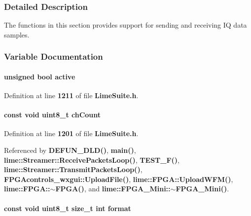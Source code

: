 \subsubsection{Detailed Description}
The functions in this section provides support for sending and receiving IQ data samples. 



\subsubsection{Variable Documentation}
\paragraph[{active}]{\setlength{\rightskip}{0pt plus 5cm}unsigned bool active}\label{group__FN__STREAM_ga44af5b3ba9277b57c8c05926b7a2b5cb}


Definition at line {\bf 1211} of file {\bf Lime\+Suite.\+h}.

\paragraph[{ch\+Count}]{\setlength{\rightskip}{0pt plus 5cm}const {\bf void} uint8\+\_\+t ch\+Count}\label{group__FN__STREAM_ga3c63a4089587cf189d87730ef2bf7402}


Definition at line {\bf 1201} of file {\bf Lime\+Suite.\+h}.



Referenced by {\bf D\+E\+F\+U\+N\+\_\+\+D\+L\+D()}, {\bf main()}, {\bf lime\+::\+Streamer\+::\+Receive\+Packets\+Loop()}, {\bf T\+E\+S\+T\+\_\+\+F()}, {\bf lime\+::\+Streamer\+::\+Transmit\+Packets\+Loop()}, {\bf F\+P\+G\+Acontrols\+\_\+wxgui\+::\+Upload\+File()}, {\bf lime\+::\+F\+P\+G\+A\+::\+Upload\+W\+F\+M()}, {\bf lime\+::\+F\+P\+G\+A\+::$\sim$\+F\+P\+G\+A()}, and {\bf lime\+::\+F\+P\+G\+A\+\_\+\+Mini\+::$\sim$\+F\+P\+G\+A\+\_\+\+Mini()}.

\paragraph[{format}]{\setlength{\rightskip}{0pt plus 5cm}const {\bf void} uint8\+\_\+t size\+\_\+t {\bf int} format}\label{group__FN__STREAM_gaad9b08c92854f938d313c29fd0022e5d}


